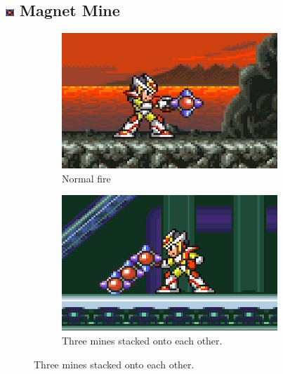 \subsection{\includegraphics[width=12px, height=10px]{figures/X2/weapons/M_mine.png} Magnet Mine}\label{Magnet_mine}
\begin{figure}[htp]
	\centering
	\begin{subfigure}[t]{0.4\linewidth}
		\includegraphics[width=\linewidth]{figures/X2/weapons/M_mine_1.png}	
		\caption{Normal fire}
	\end{subfigure}
	\begin{subfigure}[t]{0.4\linewidth}
		\centering
		\includegraphics[width=\linewidth]{figures/X2/weapons/M_mine_2.png}	
		\caption{Three mines stacked onto each other.}
	\end{subfigure}
\end{figure}
